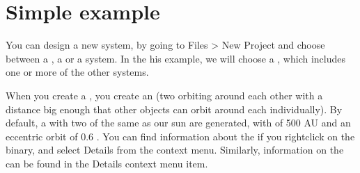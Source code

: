 \documentclass[letterpaper,10pt,english]{sphinxmanual}
\begin{document}
\section{Simple example}
\label{\detokenize{gui/gui:simple-example}}
\sphinxAtStartPar
You can design a new system, by going to Files \sphinxhyphen{}\textgreater{} New Project
and choose between a {\hyperref[\detokenize{celestial_systems/planetary_system:id1}]{}}, a
{\hyperref[\detokenize{celestial_systems/stellar_system:id1}]{}} or a {\hyperref[\detokenize{celestial_systems/multi_stellar_system:id1}]{}} system.
In the his example, we will choose a {\hyperref[\detokenize{celestial_systems/multi_stellar_system:id1}]{}},
which includes one or more of the other systems.

\sphinxAtStartPar
When you create a {\hyperref[\detokenize{celestial_systems/multi_stellar_system:id1}]{}},
you create an {\hyperref[\detokenize{celestial_systems/binary_system:id1}]{}}
(two {\hyperref[\detokenize{celestial_bodies/star:id1}]{}} orbiting around each other with a distance big enough that other objects
can orbit around each {\hyperref[\detokenize{celestial_bodies/star:id1}]{}} individually). By default, a {\hyperref[\detokenize{celestial_systems/binary_system:id1}]{}}
with two {\hyperref[\detokenize{celestial_bodies/star:id1}]{}} of the same {\hyperref[\detokenize{quantities/material/mass:id1}]{}} as our sun are generated,
with {\hyperref[\detokenize{quantities/orbital/semi_major_axis:id1}]{}} of 500 AU
and an eccentric orbit of 0.6 {\hyperref[\detokenize{quantities/orbital/eccentricity:id1}]{}}.
You can find information about the  {\hyperref[\detokenize{celestial_systems/binary_system:id1}]{}} if you right\sphinxhyphen{}click on the binary,
and select Details from the context menu. Similarly, information on the {\hyperref[\detokenize{celestial_bodies/star:id1}]{}} can be
found in the Details context menu item.
\end{document}
